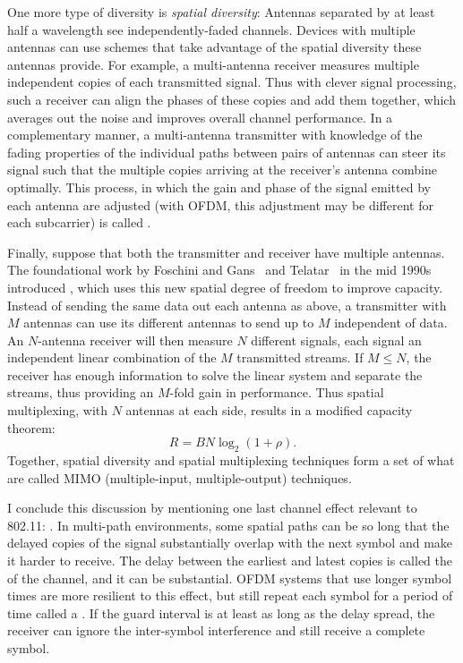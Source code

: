 One more type of diversity is \emph{spatial diversity}: Antennas separated by at least half a wavelength see independently-faded channels. Devices with multiple antennas can use schemes that take advantage of the spatial diversity these antennas provide. For example, a multi-antenna receiver measures multiple independent copies of each transmitted signal. Thus with clever signal processing, such a receiver can align the phases of these copies and add them together, which averages out the noise and improves overall channel performance. In a complementary manner, a multi-antenna transmitter with knowledge of the fading properties of the individual paths between pairs of antennas can steer its signal such that the multiple copies arriving at the receiver's antenna combine optimally. This process, in which the gain and phase of the signal emitted by each antenna are adjusted (with OFDM, this adjustment may be different for each subcarrier) is called .

Finally, suppose that both the transmitter and receiver have multiple antennas. The foundational work by Foschini and Gans~\cite{Foschini_Gans} and Telatar~\cite{Telatar_MIMO} in the mid 1990s introduced , which uses this new spatial degree of freedom to improve capacity. Instead of sending the same data out each antenna as above, a transmitter with $M$ antennas can use its different antennas to send up to $M$ independent  of data. An $N$-antenna receiver will then measure $N$ different signals, each signal an independent linear combination of the $M$ transmitted streams. If $M \leq N$, the receiver has enough information to solve the linear system and separate the streams, thus providing an $M$-fold gain in performance. Thus spatial multiplexing, with $N$ antennas at each side, results in a modified capacity theorem:
\begin{equation}
\label{eq:mimo_capacity}
R = BN\log_2(1+\rho).
\end{equation}
Together, spatial diversity and spatial multiplexing techniques form a set of what are called MIMO (multiple-input, multiple-output) techniques.

I conclude this discussion by mentioning one last channel effect relevant to 802.11: . In multi-path environments, some spatial paths can be so long that the delayed copies of the signal substantially overlap with the next symbol and make it harder to receive. The delay between the earliest and latest copies is called the  of the channel, and it can be substantial. OFDM systems that use longer symbol times are more resilient to this effect, but still repeat each symbol for a period of time called a . If the guard interval is at least as long as the delay spread, the receiver can ignore the inter-symbol interference and still receive a complete symbol.

